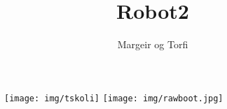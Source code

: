 \documentclass{article}
\begin{document}
\title {Robot2}
\author{Margeir og Torfi}
\maketitle
\begin{figure}[h]
\centering
\texttt{[image: img/tskoli]}
\texttt{[image: img/rawboot.jpg]}
\end{figure}
\newpage
\tableofcontents
\newpage




\end{document}
